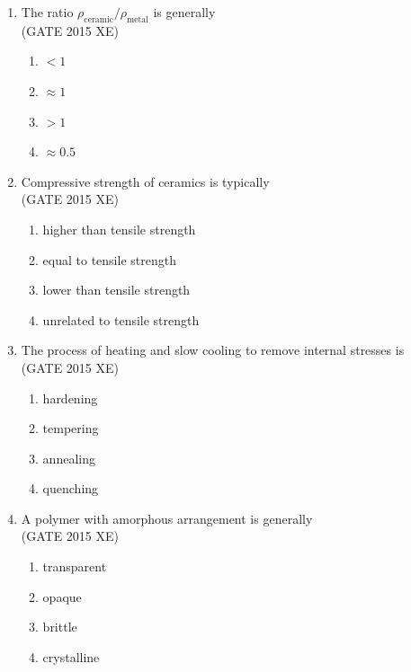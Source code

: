 \documentclass[journal,12pt,onecolumn]{IEEEtran}
\begin{document}
\begin{enumerate}
\newpage

\item The ratio $\rho_{\text{ceramic}}/\rho_{\text{metal}}$ is generally \\ 
\hfill{(GATE 2015 XE)} 
\begin{multicols}{4}
\begin{enumerate}
\item $<1$
\item $\approx 1$
\item $>1$
\item $\approx 0.5$
\end{enumerate}
\end{multicols}

\item Compressive strength of ceramics is typically  \\
\hfill{(GATE 2015 XE)} 
\begin{multicols}{2}
\begin{enumerate}
\item higher than tensile strength
\item equal to tensile strength
\item lower than tensile strength
\item unrelated to tensile strength
\end{enumerate}
\end{multicols}

\item The process of heating and slow cooling to remove internal stresses is\\
\hfill{(GATE 2015 XE)} 

\begin{multicols}{4}
\begin{enumerate}
\item hardening
\item tempering
\item annealing
\item quenching
\end{enumerate}
\end{multicols}

\item A polymer with amorphous arrangement is generally  \\
\hfill{(GATE 2015 XE)} 

\begin{multicols}{4}
\begin{enumerate}
\item transparent
\item opaque
\item brittle
\item crystalline
\end{enumerate}
\end{multicols}


\end{enumerate}
\end{document}
